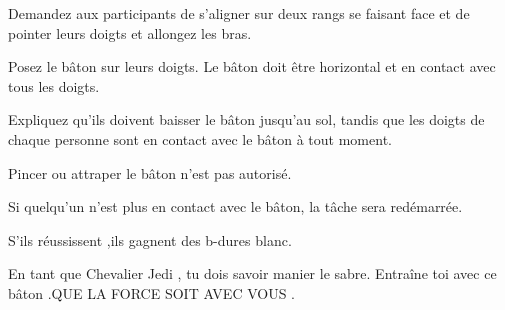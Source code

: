 \documentclass{grand-jeu}
\begin{document}
\begin{liste-materiel}
\end{liste-materiel}

\begin{regles}
Demandez aux participants de s’aligner sur deux rangs se faisant face et de pointer leurs doigts et allongez les bras.

Posez le bâton sur leurs doigts. Le bâton doit être horizontal et en contact avec tous les doigts.

Expliquez qu’ils doivent baisser le bâton jusqu’au sol, tandis que les doigts de chaque personne sont en contact avec le bâton à tout moment.

Pincer ou attraper le bâton n’est pas autorisé.

Si quelqu’un n’est plus en contact avec le bâton, la tâche sera redémarrée.

S'ils réussissent ,ils gagnent des b-dures blanc.
\end{regles}

\begin{imaginaire}

En tant que Chevalier Jedi , tu dois savoir manier le sabre. Entraîne toi avec ce bâton .QUE LA FORCE SOIT AVEC VOUS .


\end{imaginaire}

\begin{moments-stop}
\end{moments-stop}
\end{document}
